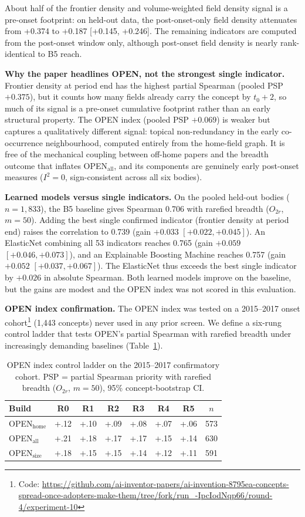 \documentclass[11pt,letterpaper]{article}
\begin{document}
About half of the frontier density and volume-weighted field density signal is a pre-onset footprint: on held-out data, the post-onset-only field density attenuates from +0.374 to +0.187 [+0.145, +0.246]. The remaining indicators are computed from the post-onset window only, although post-onset field density is nearly rank-identical to B5 reach.

\textbf{Why the paper headlines OPEN, not the strongest single indicator.} Frontier density at period end has the highest partial Spearman (pooled PSP $+0.375$), but it counts how many fields already carry the concept by $t_0{+}2$, so much of its signal is a pre-onset cumulative footprint rather than an early structural property. The OPEN index (pooled PSP $+0.069$) is weaker but captures a qualitatively different signal: topical non-redundancy in the early co-occurrence neighbourhood, computed entirely from the home-field graph. It is free of the mechanical coupling between off-home papers and the breadth outcome that inflates OPEN$_\text{all}$, and its components are genuinely early post-onset measures ($I^2 = 0$, sign-consistent across all six bodies).

\textbf{Learned models versus single indicators.} On the pooled held-out bodies ($n = 1{,}833$), the B5 baseline gives Spearman 0.706 with rarefied breadth ($O_{2r}$, $m = 50$). Adding the best single confirmed indicator (frontier density at period end) raises the correlation to 0.739 (gain $+0.033$ $[+0.022, +0.045]$). An ElasticNet combining all 53 indicators reaches 0.765 (gain $+0.059$ $[+0.046, +0.073]$), and an Explainable Boosting Machine reaches 0.757 (gain $+0.052$ $[+0.037, +0.067]$). The ElasticNet thus exceeds the best single indicator by $+0.026$ in absolute Spearman. Both learned models improve on the baseline, but the gains are modest and the OPEN index was not scored in this evaluation.

\textbf{OPEN index confirmation.} The OPEN index was tested on a 2015--2017 onset cohort\footnote{Code: \url{https://github.com/ai-inventor-papers/ai-invention-8795ea-concepts-spread-once-adopters-make-them/tree/fork/run_-IpcIodNqp66/round-4/experiment-10}} (1{,}443 concepts) never used in any prior screen. We define a six-rung control ladder that tests OPEN's partial Spearman with rarefied breadth under increasingly demanding baselines (Table~\ref{tab:ladder}).

\begin{table}[!htbp]
\centering
\caption{OPEN index control ladder on the 2015--2017 confirmatory cohort. PSP = partial Spearman priority with rarefied breadth ($O_{2r}$, $m = 50$), 95\% concept-bootstrap CI.}
\label{tab:ladder}
\small
\begin{tabular}{lccccccc}
\toprule
Build & R0 & R1 & R2 & R3 & R4 & R5 & $n$ \\
\midrule
OPEN$_{\text{home}}$ & +.12 & +.10 & +.09 & +.08 & +.07 & +.06 & 573 \\
OPEN$_{\text{all}}$ & +.21 & +.18 & +.17 & +.17 & +.15 & +.14 & 630 \\
OPEN$_{\text{size}}$ & +.18 & +.15 & +.15 & +.14 & +.12 & +.11 & 591 \\
\bottomrule
\end{tabular}
\end{table}
\end{document}
